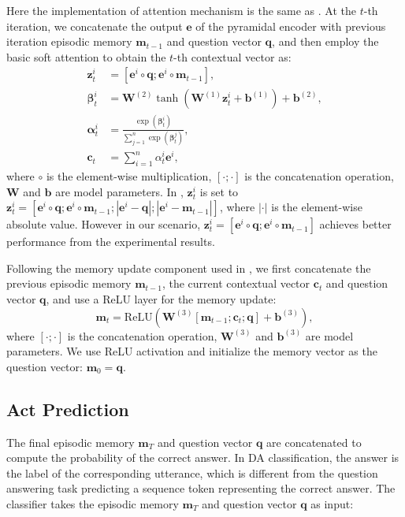 \documentclass[conference]{IEEEtran}
\begin{document}
	Here the implementation of attention mechanism is the same as \cite{bahdanau2014neural}. At the $t$-th iteration, we concatenate the output $\mathbf{e}$ of the pyramidal encoder with previous iteration episodic memory $\mathbf{m}_{t-1}$  and question vector $\mathbf{q}$, and then employ the basic soft attention to obtain the $t$-th contextual vector as:
	\begin{align}
	\mathbf{z}_t^i &=[\mathbf{e}^i \circ \mathbf{q}; \mathbf{e}^i \circ \mathbf{m}_{t-1}],\\
	\mathbf{\beta}_t^i  &= \mathbf{W}^{(2)}\tanh \left(\mathbf{W}^{(1)}\mathbf{z}_t^i+\mathbf{b}^{(1)} \right)+\mathbf{b}^{(2)},\\
	\mathbf{\alpha}_t^i &=\frac{\exp(\mathbf{\beta}_t^i)}{\sum_{j=1}^n\exp(\mathbf{\beta}_t^j)}, \\
	\mathbf{c}_t &=\sum_{i=1}^n\alpha_t^i \mathbf{e}^i,
	\end{align}
	where $\circ$ is the element-wise multiplication, $[\cdot;\cdot]$ is the concatenation operation, $\mathbf{W}$ and $\mathbf{b}$ are model parameters. In \cite{xiong2016dynamic}, $\mathbf{z}_t^i$ is set to $\mathbf{z}_t^i=[\mathbf{e}^i \circ \mathbf{q}; \mathbf{e}^i \circ \mathbf{m}_{t-1}; |\mathbf{e}^i - \mathbf{q}|; |\mathbf{e}^i - \mathbf{m}_{t-1}|]$, where $|\cdot|$ is the element-wise absolute value. However in our scenario, $\mathbf{z}_t^i =[\mathbf{e}^i \circ \mathbf{q}; \mathbf{e}^i \circ \mathbf{m}_{t-1}]$ achieves better performance from the experimental results.
	
	Following the memory update component used in \cite{peng2015towards}, we first concatenate the previous episodic memory $\mathbf{m}_{t-1}$, the current contextual vector $\mathbf{c}_t$ and question vector $\mathbf{q}$, and use a ReLU layer for the memory update:
	\begin{equation}
	\mathbf{m}_t=\text{ReLU}(\mathbf{W}^{(3)}[\mathbf{m}_{t-1};\mathbf{c}_t;\mathbf{q}]+\mathbf{\mathbf{b}}^{(3)}), 
	\end{equation}
	where $[\cdot;\cdot]$ is the concatenation operation, $\mathbf{W}^{(3)}$ and $\mathbf{b}^{(3)}$ are model parameters. We use ReLU activation and initialize the memory vector as the question vector: $\mathbf{m}_0=\mathbf{q}$. 
	
	\subsection{Act Prediction}\label{subsec_output}
	The final episodic memory $\mathbf{m}_T$ and question vector $\mathbf{q}$ are concatenated to compute the probability of the correct answer. In DA classification, the answer is the label of the corresponding utterance, which is different from the question answering task predicting a sequence token representing the correct answer. 
	The classifier takes the episodic memory $\mathbf{m}_T$ and question vector $\mathbf{q}$ as input:
	
\end{document}
